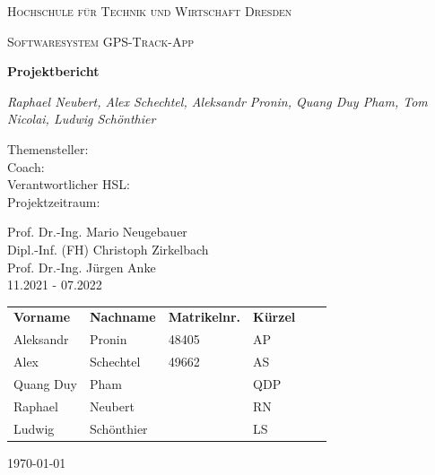 \documentclass[10pt]{article}
\begin{document}
\begin{titlepage}
    \centering
    {\scshape\LARGE Hochschule für Technik und Wirtschaft Dresden \par}
    \vspace{1cm}
    {\scshape\Large Softwaresystem \glqq GPS-Track-App\grqq\par}
    \vspace{1.5cm}
    {\huge\bfseries Projektbericht\par}
    \vspace{2cm}
    {\Large\itshape Raphael Neubert, Alex Schechtel, Aleksandr Pronin, Quang Duy Pham, Tom Nicolai, Ludwig Schönthier\par}
    \vfill
    \vfill
    \begin{minipage}{0.3\textwidth}
        Themensteller:\\
        Coach:\\
        Verantwortlicher HSL:\\
        Projektzeitraum:
    \end{minipage}
    \begin{minipage}{0.4\textwidth}
        Prof. Dr.-Ing. Mario Neugebauer\\
        Dipl.-Inf. (FH) Christoph Zirkelbach\\
        Prof. Dr.-Ing. Jürgen Anke\\
        11.2021 - 07.2022
    \end{minipage}
    \vfill
\begin{table}[H]
    \begin{tabular}{llllll}
    \textbf{Vorname} & \textbf{Nachname} & \textbf{Matrikelnr.} & \textbf{Kürzel} &  &  \\
    Aleksandr        & Pronin            & 48405                & AP              &  &  \\
    Alex             & Schechtel         & 49662                & AS              &  &  \\
    Quang Duy        & Pham              &                      & QDP             &  &  \\
    Raphael          & Neubert           &                      & RN              &  &  \\
    Ludwig           & Schönthier        &                      & LS              &  &
    \end{tabular}
    \centering
\end{table}
\vfill

    {\large \today\par}
\end{titlepage}
\tableofcontents
\newpage
{}
\end{document}

